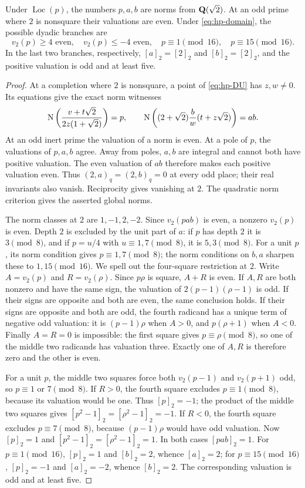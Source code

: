 \begin{lemma}\label{lem:hp-norms}
Under $\operatorname{Loc}(p)$, the numbers $p,a,b$ are norms from
$\mathbf Q(\sqrt2)$.  At an odd prime where $2$ is nonsquare their valuations
are even.  Under \eqref{eq:hp-domain}, the possible dyadic branches are
\[
 v_2(p)\ge4\text{ even},\quad v_2(p)\le-4\text{ even},\quad
 p\equiv1\pmod {16},\quad p\equiv15\pmod {16}.
\]
In the last two branches, respectively, $[a]_2=[2]_2$ and
$[b]_2=[2]_2$, and the positive valuation is odd and at least five.
\end{lemma}
\begin{proof}
At a completion where $2$ is nonsquare, a point of \eqref{eq:hp-DU}
has $z,w\ne0$.  Its equations give the exact norm witnesses
\[
 \operatorname{N}\left(\frac{v+t\sqrt2}{2z(1+\sqrt2)}\right)=p,
 \qquad
 \operatorname{N}\left((2+\sqrt2)\frac b w(t+z\sqrt2)\right)=ab.
\]
At an odd inert prime the valuation of a norm is even.  At a pole of
$p$, the valuations of $p,a,b$ agree.  Away from poles, $a,b$ are
integral and cannot both have positive valuation.  The even valuation
of $ab$ therefore makes each positive valuation even.  Thus
$(2,a)_q=(2,b)_q=0$ at every odd place; their real invariants also vanish.
Reciprocity gives vanishing at $2$.  The quadratic norm criterion gives
the asserted global norms.

The norm classes at $2$ are $1,-1,2,-2$.  Since
$v_2(pab)$ is even, a nonzero $v_2(p)$ is even.  Depth $2$ is excluded
by the unit part of $a$: if $p$ has depth $2$ it is $3\pmod8$, and
if $p=u/4$ with $u\equiv1,7\pmod8$, it is $5,3\pmod8$.
For a unit $p$, its norm condition gives $p\equiv1,7\pmod8$;
the norm conditions on $b,a$ sharpen these to $1,15\pmod {16}$.
We spell out the four-square restriction at $2$.
Write $A=v_2(p)$ and $R=v_2(\rho)$.  Since $p\rho$ is square,
$A+R$ is even.  If $A,R$ are both nonzero and have the same sign,
the valuation of $2(p-1)(\rho-1)$ is odd.  If their signs are opposite
and both are even, the same conclusion holds.  If their signs are
opposite and both are odd, the fourth radicand has a unique term of
negative odd valuation: it is $(p-1)\rho$ when $A>0$, and
$p(\rho+1)$ when $A<0$.  Finally $A=R=0$ is impossible: the first
square gives $p\equiv\rho\pmod8$, so one of the middle two radicands
has valuation three.  Exactly one of $A,R$ is therefore zero and the
other is even.

For a unit $p$, the middle two squares force both $v_2(p-1)$ and
$v_2(p+1)$ odd, so $p\equiv1$ or $7\pmod8$.  If $R>0$, the fourth
square excludes $p\equiv1\pmod8$, because its valuation would be one.
Thus $[p]_2=-1$; the product of the middle two squares gives
$[p^2-1]_2=[\rho^2-1]_2=-1$.
If $R<0$, the fourth square excludes $p\equiv7\pmod8$, because
$(p-1)\rho$ would have odd valuation.  Now $[p]_2=1$ and
$[p^2-1]_2=[\rho^2-1]_2=1$.
In both cases $[pab]_2=1$.
For $p\equiv1\pmod {16}$, $[p]_2=1$ and $[b]_2=2$, whence
$[a]_2=2$; for $p\equiv15\pmod {16}$, $[p]_2=-1$ and
$[a]_2=-2$, whence $[b]_2=2$.  The corresponding valuation is odd
and at least five.
\end{proof}


